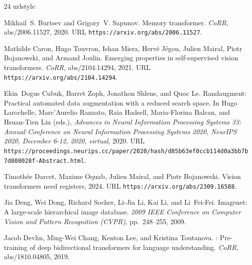 \documentclass[10pt]{article} \usepackage[preprint]{tmlr}
\begin{document}
\begin{thebibliography}{24}
\providecommand{\natexlab}[1]{#1}
\providecommand{\url}[1]{\texttt{#1}}
\expandafter\ifx\csname urlstyle\endcsname\relax
  \providecommand{\doi}[1]{doi: #1}\else
  \providecommand{\doi}{doi: \begingroup \urlstyle{rm}\Url}\fi

Mikhail~S. Burtsev and Grigory~V. Sapunov.
\newblock Memory transformer.
\newblock \emph{CoRR}, abs/2006.11527, 2020.
\newblock URL \url{https://arxiv.org/abs/2006.11527}.

Mathilde Caron, Hugo Touvron, Ishan Misra, Herv{\'e} J{\'e}gou, Julien Mairal,
  Piotr Bojanowski, and Armand Joulin.
\newblock Emerging properties in self-supervised vision transformers.
\newblock \emph{CoRR}, abs/2104.14294, 2021.
\newblock URL \url{https://arxiv.org/abs/2104.14294}.

Ekin~Dogus Cubuk, Barret Zoph, Jonathon Shlens, and Quoc Le.
\newblock Randaugment: Practical automated data augmentation with a reduced
  search space.
\newblock In Hugo Larochelle, Marc'Aurelio Ranzato, Raia Hadsell,
  Maria{-}Florina Balcan, and Hsuan{-}Tien Lin (eds.), \emph{Advances in Neural
  Information Processing Systems 33: Annual Conference on Neural Information
  Processing Systems 2020, NeurIPS 2020, December 6-12, 2020, virtual}, 2020.
\newblock URL
  \url{https://proceedings.neurips.cc/paper/2020/hash/d85b63ef0ccb114d0a3bb7b7d808028f-Abstract.html}.

Timoth{\'e}e Darcet, Maxime Oquab, Julien Mairal, and Piotr Bojanowski.
\newblock Vision transformers need registers, 2024.
\newblock URL \url{https://arxiv.org/abs/2309.16588}.

Jia Deng, Wei Dong, Richard Socher, Li{-}Jia Li, Kai Li, and Li~Fei-Fei.
\newblock Imagenet: A large-scale hierarchical image database.
\newblock \emph{2009 IEEE Conference on Computer Vision and Pattern Recognition
  (CVPR)}, pp.\  248--255, 2009.

Jacob Devlin, Ming{-}Wei Chang, Kenton Lee, and Kristina Toutanova.
: Pre-training of deep bidirectional transformers for language
  understanding.
\newblock \emph{CoRR}, abs/1810.04805, 2019.


\end{thebibliography}
\end{document}
